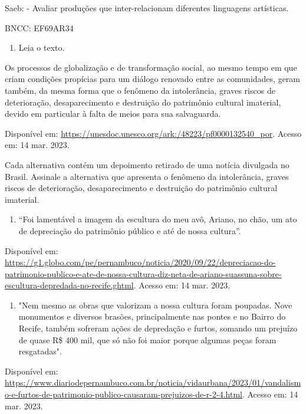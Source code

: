 \begin{escolha}
{{{{{{Saeb: - Avaliar produções que inter-relacionam diferentes linguagens
artísticas.

BNCC: EF69AR34

\begin{enumerate}
\def\labelenumi{\arabic{enumi}.}
\item
  Leia o texto.
\end{enumerate}

Os processos de globalização e de transformação social, ao mesmo tempo
em que criam condições propícias para um diálogo renovado entre as
comunidades, geram também, da mesma forma que o fenômeno da
intolerância, graves riscos de deterioração, desaparecimento e
destruição do patrimônio cultural imaterial, devido em particular à
falta de meios para sua salvaguarda.

Disponível em:
\url{https://unesdoc.unesco.org/ark:/48223/pf0000132540_por}. Acesso em:
14 mar. 2023.

Cada alternativa contém um depoimento retirado de uma notícia divulgada
no Brasil. Assinale a alternativa que apresenta o fenômeno da
intolerância, graves riscos de deterioração, desaparecimento e
destruição do patrimônio cultural imaterial.

\begin{enumerate}
\def\labelenumi{\alph{enumi}.}
\item
  ``Foi lamentável a imagem da escultura do meu avô, Ariano, no chão, um
  ato de depreciação do patrimônio público e até de nossa cultura''.
\end{enumerate}

Disponível em:
\url{https://g1.globo.com/pe/pernambuco/noticia/2020/09/22/depreciacao-do-patrimonio-publico-e-ate-de-nossa-cultura-diz-neta-de-ariano-suassuna-sobre-escultura-depredada-no-recife.ghtml}.
Acesso em: 14 mar. 2023.

\begin{enumerate}
\def\labelenumi{\alph{enumi}.}
\item
  "Nem mesmo as obras que valorizam a nossa cultura foram poupadas. Nove
  monumentos e diversos brasões, principalmente nas pontes e no Bairro
  do Recife, também sofreram ações de depredação e furtos, somando um
  prejuízo de quase R\$ 400 mil, que só não foi maior porque algumas
  peças foram resgatadas".
\end{enumerate}

Disponível em:
\url{https://www.diariodepernambuco.com.br/noticia/vidaurbana/2023/01/vandalismo-e-furtos-de-patrimonio-publico-causaram-prejuizos-de-r-2-4.html}.
Acesso em: 14 mar. 2023.

}}}}}}
\end{escolha}
